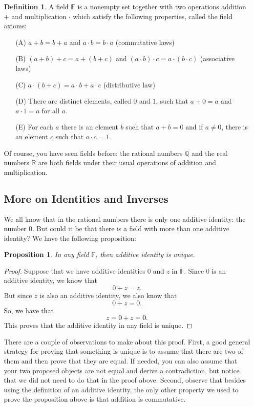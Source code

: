 \documentclass[11pt]{article}
\newtheorem{proposition}[theorem]{Proposition}
\theoremstyle{definition}
\newtheorem{definition}[theorem]{Definition}
\begin{document}
\begin{definition} A field $\mathbb{F}$ is a nonempty set together with two operations addition $+$ and multiplication $\cdot$ which satisfy the following
  properties, called the field axioms:
  \begin{enumerate}
    \item[(A)] $a+b=b+a$ and $a\cdot b=b\cdot a$ (commutative laws)
    \item[(B)] $(a+b)+c = a + (b+c)$ and $(a\cdot b)\cdot c = a\cdot (b \cdot c)$ (associative laws)
    \item[(C)] $a\cdot (b+c) = a\cdot b + a \cdot c$ (distributive law)
    \item[(D)] There are distinct elements, called $0$ and $1$, such that $a+0 = a $ and $a \cdot 1 = a$ for all $a$.
    \item[(E)] For each $a$ there is an element $b$ such that $a + b = 0$ and if $a\neq 0$, there is an element $c$ such that $a\cdot c = 1$.
  \end{enumerate}
\end{definition}

Of course, you have seen fields before: the rational numbers $\mathbb{Q}$ and the real numbers $\mathbb{R}$ are both fields under their usual operations of
addition and multiplication. 

\subsection{More on Identities and Inverses}

We all know that in the rational numbers there is only one additive identity: the number 0. But could it be that there is a field with more than one
additive identity? We have the following proposition:

\begin{proposition}
  In any field $\mathbb{F}$, then additive identity is unique.
\end{proposition}
\begin{proof}
  Suppose that we have additive identities $0$ and $z$ in $\mathbb{F}$. Since $0$ is an additive identity, we know that
  \[ 0 + z = z.\]
  But since $z$ is also an additive identity, we also know that
  \[ 0 + z = 0.\]
  So, we have that
  \[ z = 0 + z = 0.\]
  This proves that the additive identity in any field is unique.
\end{proof}

There are a couple of observations to make about this proof. First, a good general strategy for proving that something is unique is to assume that there are
two of them and then prove that they are equal.  If needed, you can also assume that your two proposed objects are not equal and derive a contradiction, but
notice that we did not need to do that in the proof above. Second, observe that besides using the definition of an additive identity, the only other property we
used to prove the proposition above is that addition is commutative.
\end{document}
